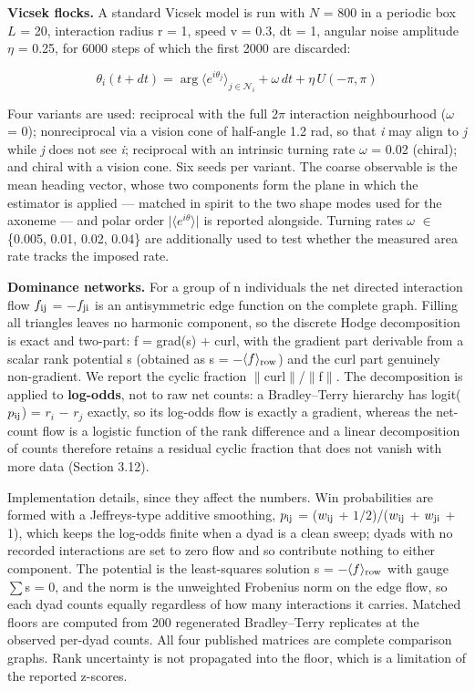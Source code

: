 \documentclass[aps,pre,preprint,superscriptaddress,nofootinbib,longbibliography]{revtex4-2}
\begin{document}
\textbf{Vicsek flocks.} A standard Vicsek model is run with $N$ = 800 in a periodic box $L$ = 20, interaction radius r = 1, speed v = 0.3, dt = 1, angular noise amplitude $\eta$ = 0.25, for 6000 steps of which the first 2000 are discarded:

\begin{equation}
\theta_i(t+dt)=\arg\big\langle e^{i\theta_j}\big\rangle_{j\in\mathcal{N}_i}+\omega\,dt+\eta\,U(-\pi,\pi)
\end{equation}

Four variants are used: reciprocal with the full 2$\pi$ interaction neighbourhood ($\omega$ = 0); nonreciprocal via a vision cone of half-angle 1.2 rad, so that \emph{i} may align to \emph{j} while \emph{j} does not see \emph{i}; reciprocal with an intrinsic turning rate $\omega$ = 0.02 (chiral); and chiral with a vision cone. Six seeds per variant. The coarse observable is the mean heading vector, whose two components form the plane in which the estimator is applied --- matched in spirit to the two shape modes used for the axoneme --- and polar order $| \langle$$e^{i\theta}$$\rangle |$ is reported alongside. Turning rates $\omega$ $\in$ \{0.005, 0.01, 0.02, 0.04\} are additionally used to test whether the measured area rate tracks the imposed rate.

\textbf{Dominance networks.} For a group of n individuals the net directed interaction flow $f_{\rm ij}$ = $-$$f_{\rm ji}$ is an antisymmetric edge function on the complete graph. Filling all triangles leaves no harmonic component, so the discrete Hodge decomposition is exact and two-part: f = grad(s) + curl, with the gradient part derivable from a scalar rank potential s (obtained as s = $-$$\langle f\rangle_{\rm row}$) and the curl part genuinely non-gradient. We report the cyclic fraction $\|$curl$\|$/$\|$f$\|$. The decomposition is applied to \textbf{log-odds}, not to raw net counts: a Bradley--Terry hierarchy has logit($p_{\rm ij}$) = $r_{i}$ $-$ $r_{j}$ exactly, so its log-odds flow is exactly a gradient, whereas the net-count flow is a logistic function of the rank difference and a linear decomposition of counts therefore retains a residual cyclic fraction that does not vanish with more data (Section 3.12).

Implementation details, since they affect the numbers. Win probabilities are formed with a Jeffreys-type additive smoothing, $p_{\rm ij}$ = ($w_{\rm ij}$ + $1/2$)/($w_{\rm ij}$ + $w_{\rm ji}$ + 1), which keeps the log-odds finite when a dyad is a clean sweep; dyads with no recorded interactions are set to zero flow and so contribute nothing to either component. The potential is the least-squares solution s = $-$$\langle f\rangle_{\rm row}$ with gauge $\sum$s = 0, and the norm is the unweighted Frobenius norm on the edge flow, so each dyad counts equally regardless of how many interactions it carries. Matched floors are computed from 200 regenerated Bradley--Terry replicates at the observed per-dyad counts. All four published matrices are complete comparison graphs. Rank uncertainty is not propagated into the floor, which is a limitation of the reported z-scores.
\end{document}
